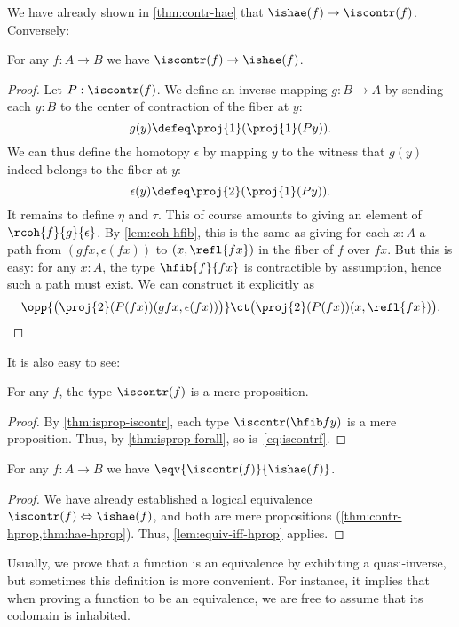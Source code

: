 We have already shown in \cref{thm:contr-hae} that $\ishae(f) \to \iscontr(f)$.
Conversely:

\begin{thm}\label{thm:lequiv-contr-hae}
For any $f:A\to B$ we have ${\iscontr(f)} \to {\ishae(f)}$.
\end{thm}
\begin{proof}
Let $P : \iscontr(f)$. We define an inverse mapping $g : B \to A$ by sending each $y : B$ to the center of contraction of the fiber at $y$:
\[ g(y) \defeq \proj{1}(\proj{1}(Py)). \]
We can thus define the homotopy $\epsilon$ by mapping $y$ to the witness that $g(y)$ indeed belongs to the fiber at $y$:
\[ \epsilon(y) \defeq \proj{2}(\proj{1}(P y)). \]
It remains to define $\eta$ and $\tau$. This of course amounts to giving an element of $\rcoh{f}{g}{\epsilon}$. By \cref{lem:coh-hfib}, this is the same as giving for each $x:A$ a path from $(gfx,\epsilon(fx))$ to $(x,\refl{fx})$ in the fiber of $f$ over $fx$. But this is easy: for any $x : A$, the type $\hfib{f}{fx}$
is contractible by assumption, hence such a path must exist. We can construct it explicitly as
\[\opp{\big(\proj{2}(P(fx))(gfx,\epsilon(fx))\big)} \ct \big(\proj{2}(P(fx)) (x,\refl{fx})\big). \qedhere \]
\end{proof}

It is also easy to see:

\begin{lem}\label{thm:contr-hprop}
  For any $f$, the type $\iscontr(f)$ is a mere proposition.
\end{lem}
\begin{proof}
  By \cref{thm:isprop-iscontr}, each type $\iscontr (\hfib f y)$ is a mere proposition.
  Thus, by \cref{thm:isprop-forall}, so is~\eqref{eq:iscontrf}.
\end{proof}

\begin{thm}\label{thm:equiv-contr-hae}
  For any $f:A\to B$ we have $\eqv{\iscontr(f)}{\ishae(f)}$.
\end{thm}
\begin{proof}
  We have already established a logical equivalence ${\iscontr(f)} \Leftrightarrow {\ishae(f)}$, and both are mere propositions (\cref{thm:contr-hprop,thm:hae-hprop}).
  Thus, \cref{lem:equiv-iff-hprop} applies.
\end{proof}

Usually, we prove that a function is an equivalence by exhibiting a quasi-inverse, but sometimes this definition is more convenient.
For instance, it implies that when proving a function to be an equivalence, we are free to assume that its codomain is inhabited.

